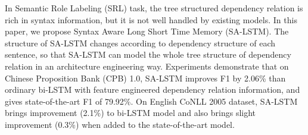 In Semantic Role Labeling (SRL) task, the tree structured dependency relation is rich in syntax information, but it is not well handled by existing models. In this paper, we propose Syntax Aware Long Short Time Memory (SA-LSTM). The structure of SA-LSTM changes according to dependency structure of each sentence, so that SA-LSTM can model the whole tree structure of dependency relation in an architecture engineering way. Experiments demonstrate that on Chinese Proposition Bank (CPB) 1.0, SA-LSTM improves F1 by 2.06\% than ordinary bi-LSTM with feature engineered dependency relation information, and gives state-of-the-art F1 of 79.92\%. On English CoNLL 2005 dataset, SA-LSTM brings improvement (2.1\%) to bi-LSTM model and also brings slight improvement (0.3\%) when added to the state-of-the-art model.
